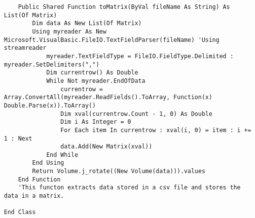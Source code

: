 \begin{verbatim}
    Public Shared Function toMatrix(ByVal fileName As String) As List(Of Matrix)
        Dim data As New List(Of Matrix)
        Using myreader As New Microsoft.VisualBasic.FileIO.TextFieldParser(fileName) 'Using streamreader
            myreader.TextFieldType = FileIO.FieldType.Delimited : myreader.SetDelimiters(",")
            Dim currentrow() As Double
            While Not myreader.EndOfData
                currentrow = Array.ConvertAll(myreader.ReadFields().ToArray, Function(x) Double.Parse(x)).ToArray()
                Dim xval(currentrow.Count - 1, 0) As Double
                Dim i As Integer = 0
                For Each item In currentrow : xval(i, 0) = item : i += 1 : Next
                data.Add(New Matrix(xval))
            End While
        End Using
        Return Volume.j_rotate((New Volume(data))).values
    End Function
    'This functon extracts data stored in a csv file and stores the data in a matrix.

End Class

\end{verbatim}